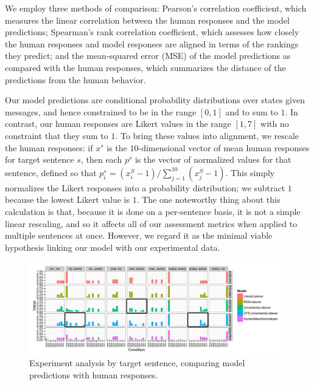 \documentclass[leqno]{article}
\begin{document}

We employ three methods of comparison: Pearson's correlation
coefficient, which measures the linear correlation between the human
responses and the model predictions; Spearman's rank correlation
coefficient, which assesses how closely the human responses and model
responses are aligned in terms of the rankings they predict; and the
mean-squared error (MSE) of the model predictions as compared with the
human responses, which summarizes the distance of the predictions
from the human behavior.


Our model predictions are conditional probability distributions over
states given messages, and hence constrained to be in the range
$[0,1]$ and to sum to $1$. In contrast, our human responses are Likert
values in the range $[1,7]$ with no constraint that they sum to
$1$. To bring these values into alignment, we rescale the human
responses: if $x^{s}$ is the $10$-dimensional vector of mean human
responses for target sentence $s$, then each $p^{s}$ is the vector of
normalized values for that sentence, defined so that $p^{s}_{i} =
(x^{S}_{i}-1)/\sum_{j=1}^{10}(x^{S}_{j}-1)$. This simply normalizes
the Likert responses into a probability distribution; we subtract $1$
because the lowest Likert value is $1$. The one noteworthy thing about
this calculation is that, because it is done on a per-sentence basis,
it is not a simple linear rescaling, and so it affects all of our
assessment metrics when applied to multiple sentences at
once. However, we regard it as the minimal viable hypothesis linking
our model with our experimental data.

\begin{figure}[t]
  \centering
  \includegraphics[width=1\textwidth]{fig/allmodels2}
  \caption{Experiment analysis by target sentence, 
    comparing model predictions with human responses.}
  \label{fig:exp-analysis}
\end{figure}
\end{document}
